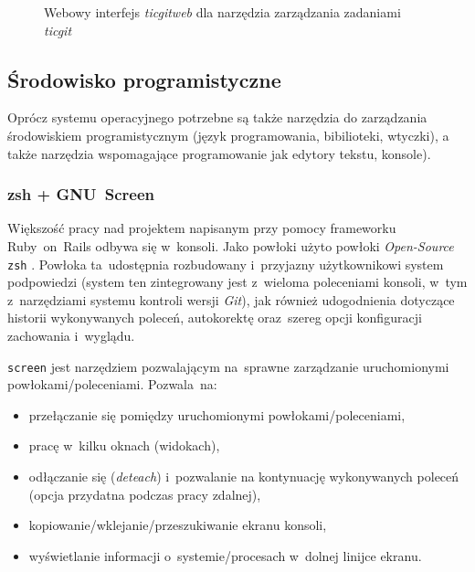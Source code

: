 \begin{figure}[ht]
\centering
{}
\caption{Webowy interfejs \textit{ticgitweb} dla narzędzia zarządzania zadaniami \textit{ticgit}}
\label{tool.ticgit}
\end{figure}

\subsection{Środowisko programistyczne}

Oprócz systemu operacyjnego potrzebne są także narzędzia do zarządzania środowiskiem programistycznym (język programowania, bibilioteki, wtyczki), a także narzędzia wspomagające programowanie jak edytory tekstu, konsole).

\subsubsection{zsh + GNU~Screen}

Większość pracy nad projektem napisanym przy pomocy frameworku Ruby~on~Rails odbywa się w~konsoli. Jako powłoki użyto powłoki \textit{Open-Source} \texttt{zsh} \cite{zsh}. Powłoka ta~udostępnia rozbudowany i~przyjazny użytkownikowi system podpowiedzi (system ten zintegrowany jest z~wieloma poleceniami konsoli, w~tym z~narzędziami systemu kontroli wersji \textit{Git}), jak również udogodnienia dotyczące historii wykonywanych poleceń, autokorektę oraz~szereg opcji konfiguracji zachowania i~wyglądu.


\texttt{screen} \cite{screen} jest narzędziem pozwalającym na~sprawne zarządzanie uruchomionymi powłokami/poleceniami. Pozwala~na:

\begin{itemize}
  \item przełączanie się pomiędzy uruchomionymi powłokami/poleceniami,
  \item pracę w~kilku oknach (widokach),
  \item odłączanie się (\textit{deteach}) i~pozwalanie na kontynuację wykonywanych poleceń (opcja przydatna podczas pracy zdalnej),
  \item kopiowanie/wklejanie/przeszukiwanie ekranu konsoli,
  \item wyświetlanie informacji o~systemie/procesach w~dolnej linijce ekranu.
\end{itemize}

